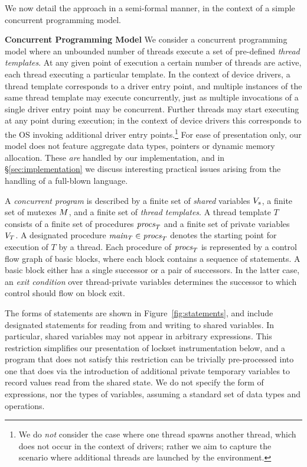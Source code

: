 We now detail the approach in a semi-formal manner, in the context of a simple concurrent programming model.

\noindent\textbf{Concurrent Programming Model }
%
We consider a concurrent programming model where an unbounded number of threads execute a set of pre-defined \emph{thread templates}.  At any given point of execution a certain number of threads are active, each thread executing a particular template.  In the context of device drivers, a thread template corresponds to a driver entry point, and multiple instances of the same thread template may execute concurrently, just as multiple invocations of a single driver entry point may be concurrent.  Further threads may start executing at any point during execution; in the context of device drivers this corresponds to the OS invoking additional driver entry points.\footnote{We do \emph{not} consider the case where one thread spawns another thread, which does not occur in the context of drivers; rather we aim to capture the scenario where additional threads are launched by the environment.}  For ease of presentation only, our model does not feature aggregate data types, pointers or dynamic memory allocation.  These \emph{are} handled by our implementation, and in \S\ref{sec:implementation} we discuss interesting practical issues arising from the handling of a full-blown language.

A \emph{concurrent program} is described by a finite set of \emph{shared} variables $V_s$, a finite set of mutexes $M$, and a finite set of \emph{thread templates}.  A thread template $T$ consists of a finite set of procedures $\mathit{procs}_{T}$ and a finite set of private variables $V_{T}$.  A designated procedure $\mathit{main}_{T} \in \mathit{procs}_{T}$ denotes the starting point for execution of $T$ by a thread.  Each procedure of $\mathit{procs}_{T}$ is represented by a control flow graph of basic blocks, where each block contains a sequence of statements.  A basic block either has a single successor or a pair of successors.  In the latter case, an \emph{exit condition} over thread-private variables determines the successor to which control should flow on block exit.

The forms of statements are shown in Figure~\ref{fig:statements}, and include designated statements for reading from and writing to shared variables.  In particular, shared variables may not appear in arbitrary expressions.  This restriction simplifies our presentation of lockset instrumentation below, and a program that does not satisfy this restriction can be trivially pre-processed into one that does via the introduction of additional private temporary variables to record values read from the shared state.  We do not specify the form of expressions, nor the types of variables, assuming a standard set of data types and operations.

